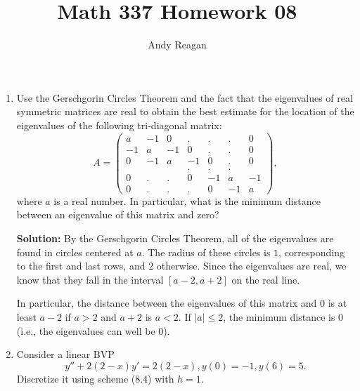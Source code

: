\documentclass[11pt]{article}
\author{Andy Reagan}
\title{Math 337 Homework 08}
\begin{document}
\maketitle

\begin{enumerate}

\item Use the Gerschgorin Circles Theorem and the fact that the eigenvalues of real symmetric matrices are real to obtain the best estimate for the location of the eigenvalues of the following tri-diagonal matrix:
\[ A = \left ( \begin{array}{ccccccc} a & -1 & 0 & . & . & . & 0\\
-1 & a & -1 & 0 & . & . & 0\\
0 & -1 & a & -1 & 0 & . & 0\\
 &  &  & . & . & . & \\
0 & . & . & 0 & -1 & a & -1\\
0 & . & . & . & 0 & -1 & a\end{array} \right ) , \]
where $a$ is a real number.
In particular, what is the minimum distance between an eigenvalue of this matrix and zero?

\bigskip
\textbf{Solution:} By the Gerschgorin Circles Theorem, all of the eigenvalues are found in circles centered at $a$.
The radius of these circles is $1$, corresponding to the first and last rows, and $2$ otherwise.
Since the eigenvalues are real, we know that they fall in the interval $[a-2,a+2]$ on the real line.

In particular, the distance between the eigenvalues of this matrix and 0 is at least $a-2$ if $a>2$ and $a+2$ is $a<2$. If $|a|\leq 2$, the minimum distance is 0 (i.e., the eigenvalues can well be 0).




\item Consider a linear BVP
\[ y'' + 2(2-x)y' = 2(2-x), y(0) = -1, y(6) = 5.\]
Discretize it using scheme (8.4) with $h = 1$.
\begin{enumerate}


\end{enumerate}
\end{enumerate}
\end{document}

